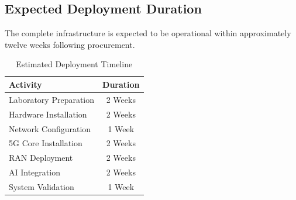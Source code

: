 \documentclass[12pt,a4paper]{article}\usepackage[a4paper,margin=1in]{geometry}\usepackage{graphicx}\usepackage{longtable}\usepackage{booktabs}\usepackage{hyperref}\usepackage{enumitem}\usepackage{amsmath}\usepackage{tikz}\usepackage{pgfgantt}\usepackage{setspace}\setstretch{1.15}\usetikzlibrary{positioning,arrows.meta,shapes.geometric}
\begin{document}
	
	\subsection{Expected Deployment Duration}
	
	The complete infrastructure is expected to be operational within approximately twelve weeks following procurement.
	
	\begin{table}[h]
		
		\centering
		
		\caption{Estimated Deployment Timeline}
		
		\begin{tabular}{lc}
			
			\toprule
			
			Activity
			
			&
			
			Duration
			
			\\
			
			\midrule
			
			Laboratory Preparation
			
			&
			
			2 Weeks
			
			\\
			
			Hardware Installation
			
			&
			
			2 Weeks
			
			\\
			
			Network Configuration
			
			&
			
			1 Week
			
			\\
			
			5G Core Installation
			
			&
			
			2 Weeks
			
			\\
			
			RAN Deployment
			
			&
			
			2 Weeks
			
			\\
			
			AI Integration
			
			&
			
			2 Weeks
			
			\\
			
			System Validation
			
			&
			
			1 Week
			
			\\
			
			\bottomrule
			
		\end{tabular}
		
	\end{table}
	
\end{document}
